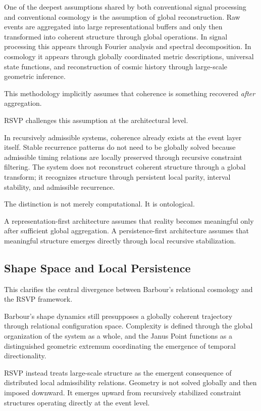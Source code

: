 \documentclass[12pt, a4paper]{article}
\begin{document}
One of the deepest assumptions shared by both conventional signal processing
and conventional cosmology is the assumption of global reconstruction.
Raw events are aggregated into large representational buffers and only then
transformed into coherent structure through global operations. In signal
processing this appears through Fourier analysis and spectral decomposition.
In cosmology it appears through globally coordinated metric descriptions,
universal state functions, and reconstruction of cosmic history through
large-scale geometric inference.

This methodology implicitly assumes that coherence is something recovered
\emph{after} aggregation.

RSVP challenges this assumption at the architectural level.

In recursively admissible systems, coherence already exists at the event
layer itself. Stable recurrence patterns do not need to be globally solved
because admissible timing relations are locally preserved through recursive
constraint filtering. The system does not reconstruct coherent structure
through a global transform; it recognizes structure through persistent local
parity, interval stability, and admissible recurrence.

The distinction is not merely computational. It is ontological.

A representation-first architecture assumes that reality becomes meaningful
only after sufficient global aggregation. A persistence-first architecture
assumes that meaningful structure emerges directly through local recursive
stabilization.

\subsection{Shape Space and Local Persistence}

This clarifies the central divergence between Barbour's relational cosmology
and the RSVP framework.

Barbour's shape dynamics still presupposes a globally coherent trajectory
through relational configuration space. Complexity is defined through the
global organization of the system as a whole, and the Janus Point functions
as a distinguished geometric extremum coordinating the emergence of temporal
directionality.

RSVP instead treats large-scale structure as the emergent consequence of
distributed local admissibility relations. Geometry is not solved globally
and then imposed downward. It emerges upward from recursively stabilized
constraint structures operating directly at the event level.
\end{document}
